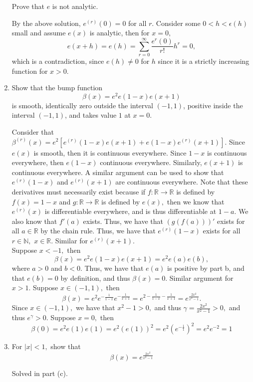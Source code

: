 \documentclass[11pt]{article}
\newcommand{\bbN}{\mathbb{N}}
\newcommand{\bbR}{\mathbb{R}}
\begin{document}
\begin{enumerate}
\begin{problem}
        Prove that $e$ is not analytic.
    \end{problem}
    \begin{solution}
        By the above solution, $e^{(r)}(0) = 0$ for all $r.$ Consider some $0<h<\epsilon(h)$ small and assume $e(x)$ is analytic, then for $x = 0,$
        \[e(x + h) = e(h) = \sum_{r=0}^\infty \frac{e^{r}(0)}{r!}h^r = 0,\] which is a contradiction, since $e(h)\neq 0$ for $h$ since it is a strictly increasing function for $x>0.$
    \end{solution}
    \item
    \begin{problem}
    Show that the bump function
 \[\beta(x) = e^2e(1-x)e(x+1)\]
 is smooth, identically zero outside the interval $(-1,1)$, positive inside the
 interval $(-1,1)$, and takes value $1$ at $x =0$.
 \end{problem}
 \begin{solution}
     Consider that $\beta^{(r)}(x) = e^2[e^{(r)}(1-x)e(x+1) + e(1-x)e^{(r)}(x+1)].$ Since $e(x)$ is smooth, then it is continuous everywhere. Since $1-x$ is continuous everywhere, then $e(1-x)$ continuous everywhere. Similarly, $e(x+1)$ is continuous everywhere. A similar argument can be used to show that $e^{(r)}(1-x)$ and $e^{(r)}(x+1)$ are continuous everywhere. Note that these derivatives must necessarily exist because if $f: \bbR \to \bbR$ is defined by $f(x) = 1-x$ and $g:\bbR\to \bbR$ is defined by $e(x),$ then we know that $e^{(r)}(x)$ is differentiable everywhere, and is thus differentiable at $1-a.$ We also know that $f'(a)$ exists. Thus, we have that $(g(f(a)))'$ exists for all $a\in \bbR$ by the chain rule. Thus, we have that $e^{(r)}(1-x)$ exists for all $r\in \bbN,$ $x\in \bbR.$ Similar for $e^{(r)}(x+1).$\\
     
     Suppose $x<-1,$ then
     \[\beta(x) = e^2e(1-x)e(x+1) = e^2e(a)e(b),\] where $a>0$ and $b<0.$ Thus, we have that $e(a)$ is positive by part b, and that $e(b)=0$ by definition, and thus $\beta(x)=0.$ Similar argument for $x>1.$ Suppose $x\in (-1,1),$ then \[\beta(x) = e^2e^{-\frac{1}{1-x}}e^{-\frac{1}{x+1}} = e^{2 - \frac{1}{1-x} - \frac{1}{x+1}} = e^{\frac{2x^2}{x^2-1}}.\] Since $x\in (-1,1),$ we have that $x^2-1>0,$ and thus $\gamma = \frac{2x^2}{x^2-1}>0,$ and thus $e^\gamma >0.$ Suppose $x = 0,$ then \[\beta(0) = e^2e(1)e(1) = e^2(e(1))^2 = e^2(e^{-\frac{1}{1}})^2 =e^2e^{-2} = 1\] 
 \end{solution}
    \item 
    \begin{problem}
        For $|x|<1,$ show that \[\beta(x) = e^{\frac{2x^2}{x^2-1}}\]
    \end{problem}
    \begin{solution}
        Solved in part (c).
    \end{solution}
\end{enumerate}
\newcommand{\osc}{\text{osc}}
\end{document}
